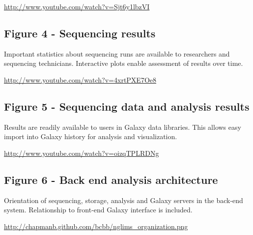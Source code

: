 \documentclass[10pt]{bmc_article}
\newenvironment{bmcformat}{\begin{raggedright}\baselineskip20pt\sloppy\setboolean{publ}{false}}{\end{raggedright}\baselineskip20pt\sloppy}
\begin{document}
\begin{bmcformat}
\url{http://www.youtube.com/watch?v=Sjt6y1lbzVI}

\subsection*{Figure 4 - Sequencing results}
Important statistics about sequencing runs are available to
researchers and sequencing technicians. Interactive plots enable
assessment of results over time.

\url{http://www.youtube.com/watch?v=4xrtPXE7Oe8}

\subsection*{Figure 5 - Sequencing data and analysis results}
Results are readily available to users in Galaxy data libraries. This
allows easy import into Galaxy history for analysis and visualization.

\url{http://www.youtube.com/watch?v=oizqTPLRDNg}

\subsection*{Figure 6 - Back end analysis architecture}
Orientation of sequencing, storage, analysis and Galaxy servers in the
back-end system. Relationship to front-end Galaxy interface is
included.

\url{http://chapmanb.github.com/bcbb/nglims_organization.png}

\end{bmcformat}
\end{document}
